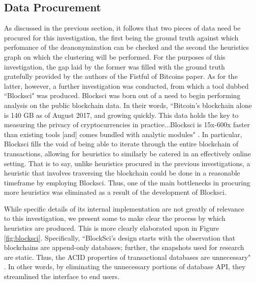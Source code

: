 \documentclass{article}
\begin{document}
\subsection{Data Procurement}
As discussed in the previous section, it follows that two pieces of data need be procured for this investigation, the first being the ground truth against which perfomance of the deanonymization can be checked and the second the heuristics graph on which the clustering will be performed. For the purposes of this investigation, the gap laid by the former was filled with the ground truth gratefully provided by the authors of the Fistful of Bitcoins paper. As for the latter, however, a further investigation was conducted, from which a tool dubbed ``Blocksci" was produced. Blocksci was born out of a need to begin performing analysis on the public blockchain data. In their words, ``Bitcoin's blockchain alone is 140 GB as of August 2017, and growing quickly. This data holds the key to measuring the privacy of cryptocurrencies in practice...Blocksci is 15x-600x faster than existing tools [and] comes bundled with analytic modules" \cite{blocksci}. In particular, Blocksci fills the void of being able to iterate through the entire blockchain of transactions, allowing for heuristics to similarly be catered in an effectively online setting. That is to say, unlike heuristics procured in the previous investigations, a heuristic that involves traversing the blockchain could be done in a reasonable timeframe by employing Blocksci. Thus, one of the main bottlenecks in procuring more heuristics was eliminated as a result of the development of Blocksci.

While specific details of its internal implementation are not greatly of relevance to this investigation, we present some to make clear the process by which heuristics are produced. This is more clearly elaborated upon in Figure \ref{fig:blocksci}. Specifically, ``BlockSci's design starts with the observation that blockchains are append-only databases; further, the snapshots used for research are static. Thus, the ACID properties of transactional databases are unnecessary" \cite{blocksci}. In other words, by eliminating the unnecessary portions of database API, they streamlined the interface to end users. 
\end{document}
